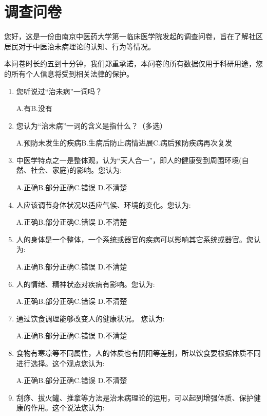  \section{调查问卷}
您好，这是一份由南京中医药大学第一临床医学院发起的调查问卷，旨在了解社区居民对于中医治未病理论的认知、行为等情况。

本问卷时长约五到十分钟，我们郑重承诺，本问卷的所有数据仅用于科研用途，您的所有个人信息将受到相关法律的保护。

\begin{enumerate}
\item 您听说过“治未病”一词吗？

A.有\qquad B.没有

\item 您认为“治未病”一词的含义是指什么？（多选）

A.预防未发生的疾病\qquad B.生病后防止病情进展\qquad C.病后预防疾病再次复发

\item 中医学特点之一是整体观，认为“天人合一”，即人的健康受到周围环境(自然、社会、家庭)的影响。您认为:

A.正确\qquad B.部分正确\qquad C.错误 \qquad D.不清楚

\item 人应该调节身体状况以适应气候、环境的变化。您认为:

A.正确\qquad B.部分正确\qquad C.错误 \qquad D.不清楚

\item 人的身体是一个整体，一个系统或器官的疾病可以影响其它系统或器官。您认为:

A.正确\qquad B.部分正确\qquad C.错误 \qquad D.不清楚

\item 人的情绪、精神状态对疾病有影响。您认为:

A.正确\qquad B.部分正确\qquad C.错误 \qquad D.不清楚

\item 通过饮食调理能够改变人的健康状况。
您认为:

A.正确\qquad B.部分正确\qquad C.错误 \qquad D.不清楚

\item 食物有寒凉等不同属性，人的体质也有阴阳等差别，所以饮食要根据体质不同进行选择。这个观点您认为:

A.正确\qquad B.部分正确\qquad C.错误 \qquad D.不清楚

\item 刮痧、拔火罐、推拿等方法是治未病理论的运用，可以起到增强体质、保护健康的作用。这个说法您认为:


\end{enumerate}
